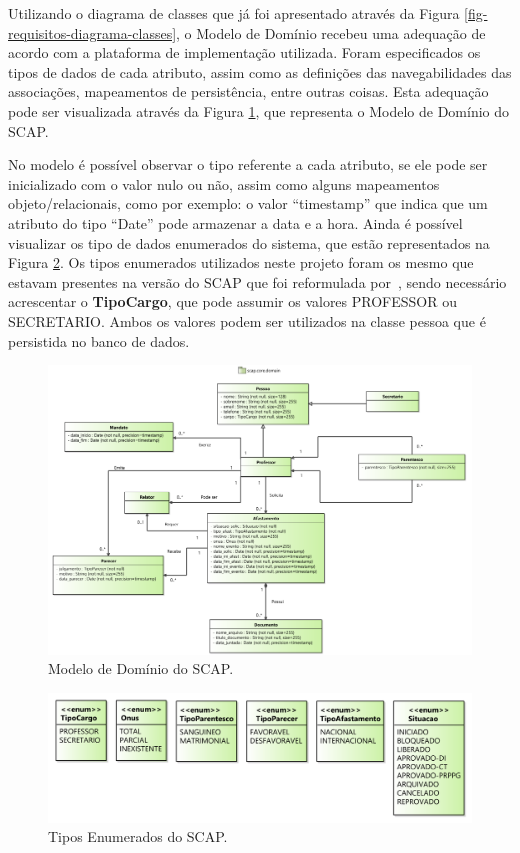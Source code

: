 Utilizando o diagrama de classes que já foi apresentado através da Figura \ref{fig-requisitos-diagrama-classes}, o Modelo de Domínio recebeu uma adequação de acordo com a plataforma de implementação utilizada. Foram especificados os tipos de dados de cada atributo, assim como as definições das navegabilidades das associações, mapeamentos de persistência, entre outras coisas. Esta adequação pode ser visualizada através da Figura \ref{fig-projeto-dominio}, que representa o Modelo de Domínio do SCAP.

No modelo é possível observar o tipo referente a cada atributo, se ele pode ser inicializado com o valor nulo ou não, assim como alguns mapeamentos objeto/relacionais, como por exemplo: o valor ``timestamp'' que indica que um atributo do tipo ``Date'' pode armazenar a data e a hora. Ainda é possível visualizar os tipo de dados enumerados do sistema, que estão representados na Figura \ref{fig-projeto-enum}. Os tipos enumerados utilizados neste projeto foram os mesmo que estavam presentes na versão do SCAP que foi reformulada por~, sendo necessário acrescentar o \textbf{TipoCargo}, que pode assumir os valores PROFESSOR ou SECRETARIO. Ambos os valores podem ser utilizados na classe pessoa que é persistida no banco de dados.   

\begin{figure}[h]
	\centering
	\includegraphics[scale=0.45]{figuras/fig-projeto-dominio} 
	\caption{Modelo de Domínio do SCAP.}
	\label{fig-projeto-dominio}
\end{figure}

\begin{figure}[h]
	\centering
	\includegraphics[scale=0.4]{figuras/fig-projeto-enum} 
	\caption{Tipos Enumerados do SCAP.}
	\label{fig-projeto-enum}
\end{figure}

